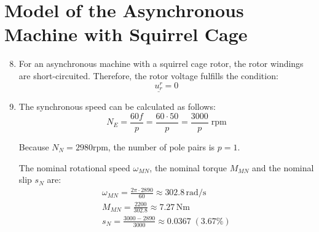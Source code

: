 \documentclass[12pt,a4paper, openany]{book}
\begin{document}
\section{ Model of the Asynchronous Machine with Squirrel Cage}
\begin{enumerate}
\setcounter{enumi}{7} %
\item For an asynchronous machine with a squirrel cage rotor, the rotor windings are short-circuited.  
Therefore, the rotor voltage fulfills the condition:
\begin{equation}
\underline{u_r^r} = 0
\end{equation}
\item 
The synchronous speed can be calculated as follows:
\begin{equation}
    N_E=\frac{60f}{p}=\frac{60 \cdot 50}{p}=\frac{3000}{p} \; \text{rpm}
\end{equation}

Because $N_N=2980 \text{rpm}$, the number of pole pairs is $p=1$.

The nominal rotational speed $\omega_{MN}$, the nominal torque $M_{MN}$ and the nominal slip $s_N$ are:
\begin{equation}
    \begin{aligned}
\omega_{MN} = \frac{2 \pi \cdot 2890}{60} \approx 302.8 \,\text{rad/s}\\
M_{MN} = \frac{2200}{302.8} \approx 7.27 \,\text{Nm}\\
s_N = \frac{3000 - 2890}{3000} \approx 0.0367 \; (3.67\%)
\end{aligned}
\end{equation}
\end{enumerate}
\end{document}
